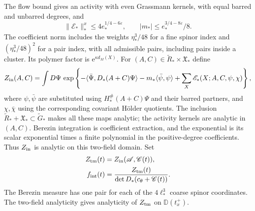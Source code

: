 \documentclass[11pt,letterpaper,reqno]{amsart}
\begin{document}
The flow bound \cite[(66)]{CoverTuning}
gives an activity with even Grassmann kernels,
with equal barred and unbarred degrees, and
\begin{equation}\label{eq:interacting-activity-input}
 \|\mathscr E_*\|_*^x
       \le4e_*^{1/4-6\varepsilon},\qquad
 |m_*|\le e_*^{3/4-8\varepsilon}/8.
\end{equation}
The coefficient norm includes the weights
$\eta_*^3/48$ for a fine spinor index and
$(\eta_*^3/48)^2$ for a pair index, with all
admissible pairs, including pairs inside a cluster.
Its polymer factor is $\mathrm e^{\kappa d_M(X)}$.
For $(A,C)\in\widetilde R_*\times\mathfrak X_*$ define
\begin{equation}\label{eq:interacting-two-field-integral}
 Z_{\rm in}(A,C)=\int D\Psi\,
 \exp\left\{-\langle\bar\Psi,D_*(A+C)\Psi\rangle
       -m_*\langle\bar\psi,\psi\rangle
       +\sum_X\mathscr E_*(X;A,C,\psi,\chi)\right\},
\end{equation}
where $\psi,\bar\psi$ are substituted using
$H_*^\#(A+C)\Psi$ and their barred partners,
and $\chi,\bar\chi$ using the corresponding
covariant Hölder quotients.
The inclusion
$\widetilde R_*+\mathfrak X_*\subset\widetilde G_*$
makes all these maps analytic; the activity
kernels are analytic in $(A,C)$.
Berezin integration is coefficient extraction,
and the exponential is its scalar exponential
times a finite polynomial in the positive-degree
coefficients. Thus $Z_{\rm in}$ is analytic
on this two-field domain.
Set
\begin{align}
 Z_{\rm tm}(t)&=Z_{\rm in}(\mathscr A,\mathscr C(t)),
                               \label{eq:interacting-terminal-integral}\\
 f_{\rm int}(t)&=
   \frac{Z_{\rm tm}(t)}{\det D_*(c_\theta+\mathscr C(t))}.
                               \label{eq:interacting-factor-definition}
\end{align}
The Berezin measure has one pair for each
of the $4\ell_*^3$ coarse spinor coordinates.
The two-field analyticity gives analyticity of
$Z_{\rm tm}$ on
$\mathbb D(t_x^+)$.
\end{document}
